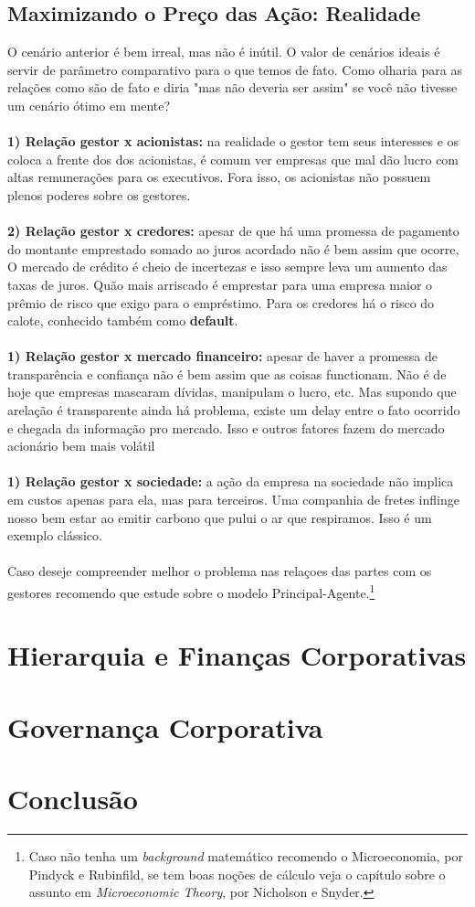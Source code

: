\subsection*{Maximizando o Preço das Ação: Realidade}
O cenário anterior é bem irreal, mas não é inútil. O valor de cenários ideais é servir de parâmetro comparativo para o que temos de fato. Como olharia para as relações como são de fato e diria "mas não deveria ser assim" se você não tivesse um cenário ótimo em mente? 
\\~\\
\textbf{1) Relação gestor x acionistas:} na realidade o gestor tem seus interesses e os coloca a frente dos dos acionistas, é comum ver empresas que mal dão lucro com altas remunerações para os executivos. Fora isso, os acionistas não possuem plenos poderes sobre os gestores.
\\~\\
\textbf{2) Relação gestor x credores:} apesar de que há uma promessa de pagamento do montante emprestado somado ao juros acordado não é bem assim que ocorre, O mercado de crédito é cheio de incertezas e isso sempre leva um aumento das taxas de juros. Quão mais arriscado é emprestar para uma empresa maior o prêmio de risco que exigo para o empréstimo. Para os credores há o risco do calote, conhecido também como \textbf{default}.
\\~\\
\textbf{1) Relação gestor x mercado financeiro:} apesar de haver a promessa de transparência e confiança não é bem assim que as coisas functionam. Não é de hoje que empresas mascaram dívidas, manipulam o lucro, etc. Mas supondo que arelação é transparente ainda há problema, existe um delay entre o fato ocorrido e chegada da informação pro mercado. Isso e outros fatores fazem do mercado acionário bem mais volátil
\\~\\
\textbf{1) Relação gestor x sociedade:} a ação da empresa na sociedade não implica em custos apenas para ela, mas para terceiros. Uma companhia de fretes inflinge nosso bem estar ao emitir carbono que pului o ar que respiramos. Isso é um exemplo clássico.
\\~\\
Caso deseje compreender melhor o problema nas relaçoes das partes com os gestores recomendo que estude sobre o modelo Principal-Agente.\footnote{Caso não tenha um \textit{background} matemático recomendo o Microeconomia, por Pindyck e Rubinfild, se tem boas noções de cálculo veja o capítulo sobre o assunto em  \textit{Microeconomic Theory}, por Nicholson e Snyder.}

\section{Hierarquia e Finanças Corporativas}

\section{Governança Corporativa}

\section{Conclusão}
